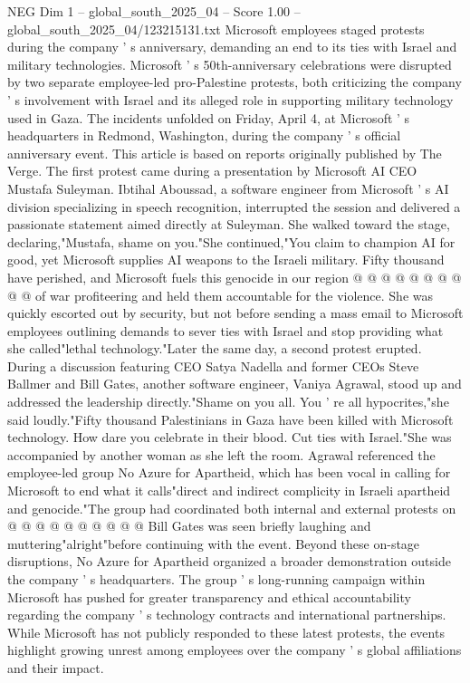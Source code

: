 \begin{textsample}{NEG Dim 1 – global\_south\_2025\_04 – Score 1.00 – global\_south\_2025\_04/123215131.txt}  \label{ex:f1_neg_130}
Microsoft employees staged protests during the company ' s anniversary, demanding an end to its ties with Israel and military technologies.
Microsoft ' s 50th-anniversary celebrations were disrupted by two separate employee-led pro-Palestine protests, both criticizing the company ' s involvement with Israel and its alleged role in supporting military technology used in Gaza.
The incidents unfolded on Friday, April 4, at Microsoft ' s headquarters in Redmond, Washington, during the company ' s official anniversary event.
This article is based on reports originally published by The Verge.
The first protest came during a presentation by Microsoft AI CEO Mustafa Suleyman.
Ibtihal Aboussad, a software engineer from Microsoft ' s AI division specializing in speech recognition, interrupted the session and delivered a passionate statement aimed directly at Suleyman.
She walked toward the stage, declaring,"Mustafa, shame on you."She continued,"You claim to champion AI for good, yet Microsoft supplies AI weapons to the Israeli military.
Fifty thousand have perished, and Microsoft fuels this genocide in our region @ @ @ @ @ @ @ @ @ @ of war profiteering and held them accountable for the violence.
She was quickly escorted out by security, but not before sending a mass email to Microsoft employees outlining demands to sever ties with Israel and stop providing what she called"lethal technology."Later the same day, a second protest erupted.
During a discussion featuring CEO Satya Nadella and former CEOs Steve Ballmer and Bill Gates, another software engineer, Vaniya Agrawal, stood up and addressed the leadership directly."Shame on you all.
You ' re all hypocrites,"she said loudly."Fifty thousand Palestinians in Gaza have been killed with Microsoft technology.
How dare you celebrate in their blood.
Cut ties with Israel."She was accompanied by another woman as she left the room.
Agrawal referenced the employee-led group No Azure for Apartheid, which has been vocal in calling for Microsoft to end what it calls"direct and indirect complicity in Israeli apartheid and genocide."The group had coordinated both internal and external protests on @ @ @ @ @ @ @ @ @ @ Bill Gates was seen briefly laughing and muttering"alright"before continuing with the event.
Beyond these on-stage disruptions, No Azure for Apartheid organized a broader demonstration outside the company ' s headquarters.
The group ' s long-running campaign within Microsoft has pushed for greater transparency and ethical accountability regarding the company ' s technology contracts and international partnerships.
While Microsoft has not publicly responded to these latest protests, the events highlight growing unrest among employees over the company ' s global affiliations and their impact.

\end{textsample}
